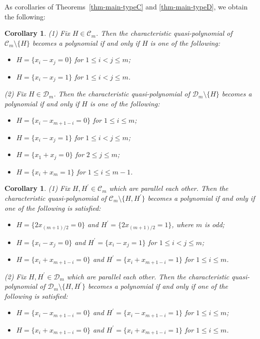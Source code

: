 \documentclass{article}
\theoremstyle{plain}
\newtheorem{Cor}[Them]{Corollary}
\theoremstyle{definition}
\theoremstyle{remark}
\numberwithin{equation}{section}
\newcommand{\Cc}{\mathcal{C}}
\newcommand{\Dc}{\mathcal{D}}
\begin{document}
As corollaries of Theorems~\ref{thm-main-typeC} and \ref{thm-main-typeD}, we obtain the following: 
\begin{Cor}\label{period-collapse-1}
{\em (1)} Fix $H \in \Cc_m$. 
Then the characteristic quasi-polynomial of $\Cc_m \setminus \{H\}$ becomes a polynomial if and only if $H$ is one of the following: 
\begin{itemize}
    \item $H=\{x_i-x_j=0\}$ for $1 \leq i<j \leq m$;
    \item $H=\{x_i-x_j=1\}$ for $1 \leq i<j \leq m$.
\end{itemize}
{\em (2)} Fix $H \in \Dc_m$. 
Then the characteristic quasi-polynomial of $\Dc_m \setminus \{H\}$ becomes a polynomial if and only if $H$ is one of the following: 
\begin{itemize}
    \item $H=\{x_i-x_{m+1-i}=0\}$ for $1 \leq i \leq m$;
    \item $H=\{x_i-x_j=1\}$ for $1 \leq i<j \leq m$; 
    \item $H=\{x_1+x_j=0\}$ for $2 \leq j \leq m$; 
    \item $H=\{x_i+x_m=1\}$ for $1 \leq i \leq m-1$.  
\end{itemize}
\end{Cor}

\begin{Cor}\label{period-collapse-2}
{\em (1)} Fix $H,H^{\prime} \in \Cc_m$ which are parallel each other. 
Then the characteristic quasi-polynomial of $\Cc_m \setminus \{H,H^{\prime}\}$ becomes a polynomial if and only if one of the following is satisfied: 
\begin{itemize}
    \item $H=\{2x_{(m+1)/2}=0\}$ and $H^{\prime}=\{2x_{(m+1)/2}=1\}$, where $m$ is odd;
    \item $H=\{x_i-x_j=0\}$ and $H^{\prime}=\{x_i-x_j=1\}$ for $1 \leq i <j \leq m$; 
    \item $H=\{x_i+x_{m+1-i}=0\}$ and $H^{\prime}=\{x_i+x_{m+1-i}=1\}$ for $1 \leq i \leq m$. 
\end{itemize}
{\em (2)} Fix $H,H^{\prime} \in \Dc_m$ which are parallel each other. 
Then the characteristic quasi-polynomial of $\Dc_m \setminus \{H,H^{\prime}\}$ becomes a polynomial if and only if one of the following is satisfied: 
\begin{itemize}
    \item $H=\{x_i-x_{m+1-i}=0\}$ and $H^{\prime}=\{x_i-x_{m+1-i}=1\}$ for $1 \leq i \leq m$; 
    \item $H=\{x_i+x_{m+1-i}=0\}$ and $H^{\prime}=\{x_i+x_{m+1-i}=1\}$ for $1 \leq i \leq m$. 
\end{itemize}
\end{Cor}
\end{document}
